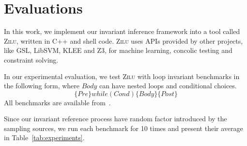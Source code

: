 
\section{Evaluations} %
\label{sec:evaluations}

In this work, we implement our invariant inference framework into a tool called \textsc{Zilu}, 
written in C++ and shell code. 
\textsc{Zilu} uses APIs provided by other projects, like GSL, LibSVM, KLEE and Z3, 
for machine learning, concolic testing and constraint solving. 

In our experimental evaluation, 
we test \textsc{Zilu} with  loop invariant benchmarks 
in the following form, where $\mathit{Body}$ can have nested loops and conditional choices. 
\[
    \{ \mathit{Pre} \} \mathit{while}(\mathit{Cond}) \{ \mathit{Body} \} \{ \mathit{Post} \}
\]
All benchmarks are available from~\cite{zilu}. 

Since our invariant reference process have random factor 
introduced by the sampling sources, 
we run each benchmark for 10 times and present their average in Table~\ref{tab:experiments}.  

